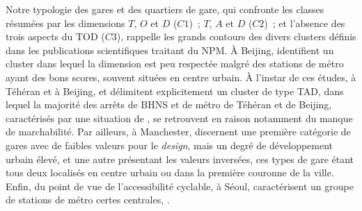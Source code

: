 \begin{refsegment}
Notre typologie des gares et des quartiers de gare, qui confronte les classes résumées par les dimensions \(T\), \(O\) et \(D\) (\(C1\))~; \(T\), \(A\) et \(D\) (\(C2\))~; et l'absence des trois aspects du \acrshort{TOD} (\(C3\)), rappelle les grands contours des divers clusters définis dans les publications scientifiques traitant du \acrshort{NPM}. À Beijing, \textcolor{blue}{\textcite[45]{lyu_developing_2016}} identifient un cluster dans lequel la dimension  est peu respectée malgré des stations de métro ayant des bons scores, souvent situées en centre urbain. À l'instar de ces études, à Téhéran et à Beijing, \textcolor{blue}{\textcite[5]{pezeshknejad_evaluating_2020}} et \textcolor{blue}{\textcite[9]{liao_evaluating_2022}} délimitent explicitement un cluster de type \acrshort{TAD}, dans lequel la majorité des arrêts de \acrshort{BHNS} et de métro de Téhéran et de Beijing, caractérisés par une situation de , se retrouvent en raison notamment du manque de marchabilité. Par ailleurs, à Manchester, \textcolor{blue}{\textcite[6]{zheng_classifying_2023}} discernent une première catégorie de gares avec de faibles valeurs pour le \textsl{design}, mais un degré de développement urbain élevé, et une autre présentant les valeurs inversées, ces types de gare étant tous deux localisés en centre urbain ou dans la première couronne de la ville. Enfin, du point de vue de l'accessibilité cyclable, à Séoul, \textcolor{blue}{\textcite[10]{rodriguez_typology_2020}} caractérisent un groupe de stations de métro certes centrales, .%


\end{refsegment}

